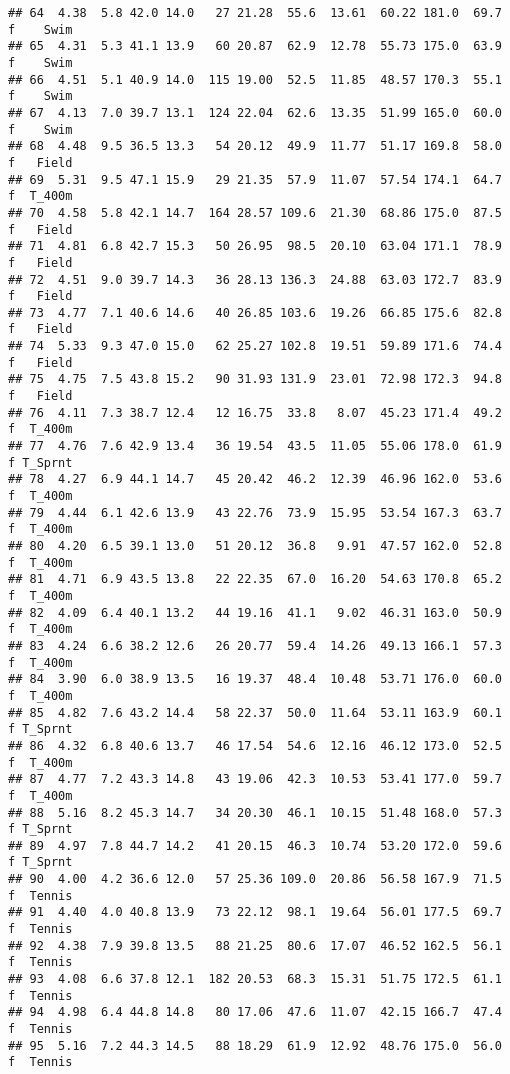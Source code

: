 \documentclass[
]{article}
\begin{document}
\begin{verbatim}
## 64  4.38  5.8 42.0 14.0   27 21.28  55.6  13.61  60.22 181.0  69.7   f    Swim
## 65  4.31  5.3 41.1 13.9   60 20.87  62.9  12.78  55.73 175.0  63.9   f    Swim
## 66  4.51  5.1 40.9 14.0  115 19.00  52.5  11.85  48.57 170.3  55.1   f    Swim
## 67  4.13  7.0 39.7 13.1  124 22.04  62.6  13.35  51.99 165.0  60.0   f    Swim
## 68  4.48  9.5 36.5 13.3   54 20.12  49.9  11.77  51.17 169.8  58.0   f   Field
## 69  5.31  9.5 47.1 15.9   29 21.35  57.9  11.07  57.54 174.1  64.7   f  T_400m
## 70  4.58  5.8 42.1 14.7  164 28.57 109.6  21.30  68.86 175.0  87.5   f   Field
## 71  4.81  6.8 42.7 15.3   50 26.95  98.5  20.10  63.04 171.1  78.9   f   Field
## 72  4.51  9.0 39.7 14.3   36 28.13 136.3  24.88  63.03 172.7  83.9   f   Field
## 73  4.77  7.1 40.6 14.6   40 26.85 103.6  19.26  66.85 175.6  82.8   f   Field
## 74  5.33  9.3 47.0 15.0   62 25.27 102.8  19.51  59.89 171.6  74.4   f   Field
## 75  4.75  7.5 43.8 15.2   90 31.93 131.9  23.01  72.98 172.3  94.8   f   Field
## 76  4.11  7.3 38.7 12.4   12 16.75  33.8   8.07  45.23 171.4  49.2   f  T_400m
## 77  4.76  7.6 42.9 13.4   36 19.54  43.5  11.05  55.06 178.0  61.9   f T_Sprnt
## 78  4.27  6.9 44.1 14.7   45 20.42  46.2  12.39  46.96 162.0  53.6   f  T_400m
## 79  4.44  6.1 42.6 13.9   43 22.76  73.9  15.95  53.54 167.3  63.7   f  T_400m
## 80  4.20  6.5 39.1 13.0   51 20.12  36.8   9.91  47.57 162.0  52.8   f  T_400m
## 81  4.71  6.9 43.5 13.8   22 22.35  67.0  16.20  54.63 170.8  65.2   f  T_400m
## 82  4.09  6.4 40.1 13.2   44 19.16  41.1   9.02  46.31 163.0  50.9   f  T_400m
## 83  4.24  6.6 38.2 12.6   26 20.77  59.4  14.26  49.13 166.1  57.3   f  T_400m
## 84  3.90  6.0 38.9 13.5   16 19.37  48.4  10.48  53.71 176.0  60.0   f  T_400m
## 85  4.82  7.6 43.2 14.4   58 22.37  50.0  11.64  53.11 163.9  60.1   f T_Sprnt
## 86  4.32  6.8 40.6 13.7   46 17.54  54.6  12.16  46.12 173.0  52.5   f  T_400m
## 87  4.77  7.2 43.3 14.8   43 19.06  42.3  10.53  53.41 177.0  59.7   f  T_400m
## 88  5.16  8.2 45.3 14.7   34 20.30  46.1  10.15  51.48 168.0  57.3   f T_Sprnt
## 89  4.97  7.8 44.7 14.2   41 20.15  46.3  10.74  53.20 172.0  59.6   f T_Sprnt
## 90  4.00  4.2 36.6 12.0   57 25.36 109.0  20.86  56.58 167.9  71.5   f  Tennis
## 91  4.40  4.0 40.8 13.9   73 22.12  98.1  19.64  56.01 177.5  69.7   f  Tennis
## 92  4.38  7.9 39.8 13.5   88 21.25  80.6  17.07  46.52 162.5  56.1   f  Tennis
## 93  4.08  6.6 37.8 12.1  182 20.53  68.3  15.31  51.75 172.5  61.1   f  Tennis
## 94  4.98  6.4 44.8 14.8   80 17.06  47.6  11.07  42.15 166.7  47.4   f  Tennis
## 95  5.16  7.2 44.3 14.5   88 18.29  61.9  12.92  48.76 175.0  56.0   f  Tennis

\end{verbatim}
\end{document}
